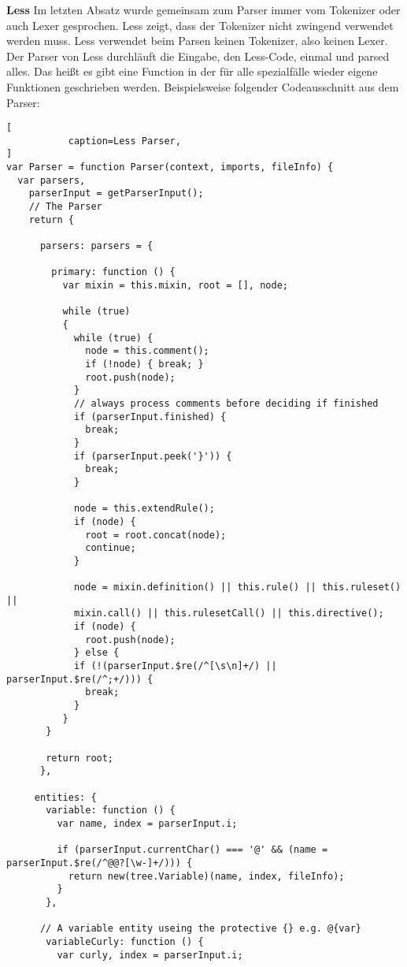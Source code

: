 \textbf{Less}\newline
Im letzten Absatz wurde gemeinsam zum Parser immer vom Tokenizer oder auch Lexer gesprochen. Less zeigt, dass der Tokenizer nicht zwingend verwendet werden muss.
Less verwendet beim Parsen keinen Tokenizer, also keinen Lexer. Der Parser von Less durchläuft die Eingabe, den Less-Code, einmal und parsed alles. Das heißt es gibt eine Function in der für alle spezialfälle wieder eigene Funktionen geschrieben werden.
Beispielsweise folgender Codeausschnitt aus dem Parser:
\begin{lstlisting}[
           caption=Less Parser,
]
var Parser = function Parser(context, imports, fileInfo) {
  var parsers,
    parserInput = getParserInput();
    // The Parser
    return {
       
      parsers: parsers = {
      
        primary: function () {
          var mixin = this.mixin, root = [], node;

          while (true)
          {
            while (true) {
              node = this.comment();
              if (!node) { break; }
              root.push(node);
            }
            // always process comments before deciding if finished
            if (parserInput.finished) {
              break;
            }
            if (parserInput.peek('}')) {
              break;
            }

            node = this.extendRule();
            if (node) {
              root = root.concat(node);
              continue;
            }

            node = mixin.definition() || this.rule() || this.ruleset() ||
            mixin.call() || this.rulesetCall() || this.directive();
            if (node) {
              root.push(node);
            } else {
            if (!(parserInput.$re(/^[\s\n]+/) || parserInput.$re(/^;+/))) {
              break;
            }
          }
       }

       return root;
      },

     entities: {
       variable: function () {
         var name, index = parserInput.i;

         if (parserInput.currentChar() === '@' && (name = parserInput.$re(/^@@?[\w-]+/))) {
           return new(tree.Variable)(name, index, fileInfo);
         }
       },

      // A variable entity useing the protective {} e.g. @{var}
       variableCurly: function () {
         var curly, index = parserInput.i;


\end{lstlisting}
